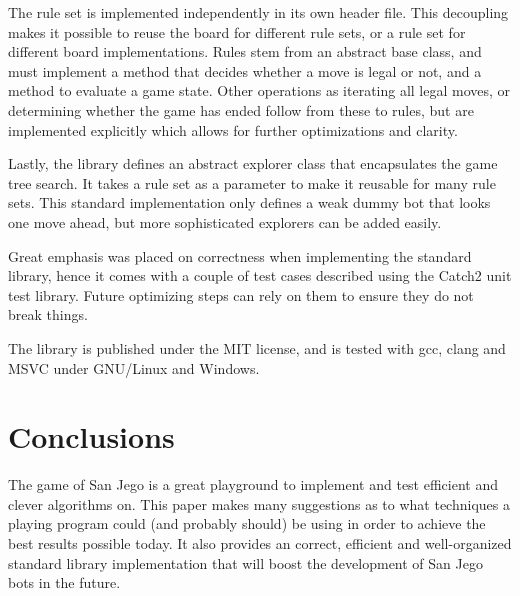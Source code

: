 \documentclass[sigconf]{acmart}
\begin{document}
The rule set is implemented independently in its own header file.
This decoupling makes it possible to reuse the board for different rule sets, or a rule set for different board implementations.
Rules stem from an abstract base class, and must implement a method that decides whether a move is legal or not, and a method to evaluate a game state.
Other operations as iterating all legal moves, or determining whether the game has ended follow from these to rules, but are implemented explicitly which allows for further optimizations and clarity.

Lastly, the library defines an abstract explorer class that encapsulates the game tree search.
It takes a rule set as a parameter to make it reusable for many rule sets.
This standard implementation only defines a weak dummy bot that looks one move ahead, but more sophisticated explorers can be added easily.

Great emphasis was placed on correctness when implementing the standard library, hence it comes with a couple of test cases described using the Catch2 unit test library.
Future optimizing steps can rely on them to ensure they do not break things.

The library is published under the MIT license, and is tested with gcc, clang and MSVC under GNU/Linux and Windows.

\section{Conclusions}
The game of San Jego is a great playground to implement and test efficient and clever algorithms on.
This paper makes many suggestions as to what techniques a playing program could (and probably should) be using in order to achieve the best results possible today.
It also provides an correct, efficient and well-organized standard library implementation that will boost the development of San Jego bots in the future.



\end{document}

